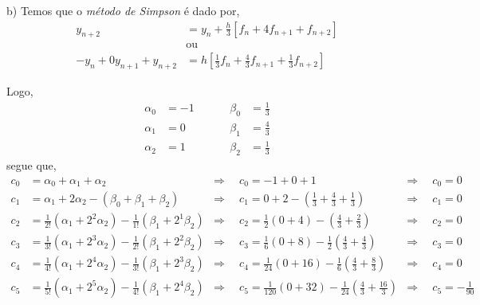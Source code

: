 \documentclass[a4paper,12pt]{article}
\begin{document}
b) Temos que o \textit{m\'etodo de Simpson} \'e dado por,
	\begin{align*}
		y_{n+2} &= y_{n} + \frac{h}{3}[f_{n} + 4f_{n+1} + f_{n+2}]\\
		&\mbox{ou}\\
		-y_{n} + 0y_{n+1} + y_{n+2} &= h[\frac{1}{3}f_{n} + \frac{4} {3}f_{n+1} + \frac{1}{3} f_{n+2}]
	\end{align*}

Logo,
	\begin{align*}
		\alpha_{0} &= -1 \hspace{1cm}& \beta_{0} &= \frac{1}{3}\\
		\alpha_{1} &=  0 \hspace{1cm}& \beta_{1} &= \frac{4}{3}\\
		\alpha_{2} &=  1 \hspace{1cm}& \beta_{2} &= \frac{1}{3}
	\end{align*}
segue que,
	\begin{align*}
		c_{0} &= \alpha_{0} + \alpha_{1} + \alpha_{2} &\Rightarrow \hspace{6pt} &c_{0} = -1 + 0 + 1 &\Rightarrow
		\hspace{2pt} &c_{0} =
		0\\
		c_{1} &= \alpha_{1} + 2\alpha_{2} -(\beta_{0} + \beta_{1} + \beta_{2}) &\Rightarrow \hspace{6pt} &c_{1} = 0 +
		2 - (\frac{1}{3} + \frac{4}{3} + \frac{1}{3}) &\Rightarrow \hspace{2pt} &c_{1} = 0\\
		c_{2} &= \frac{1}{2!}(\alpha_{1} + 2^{2}\alpha_{2}) - \frac{1}{1!}(\beta_{1} + 2^{1}\beta_{2}) &\Rightarrow
		\hspace{6pt} &c_{2} = \frac{1}{2}(0 + 4)-(\frac{4}{3} + \frac{2}{3}) &\Rightarrow \hspace{6pt} &c_{2} = 0 \\
		c_{3} &= \frac{1}{3!}(\alpha_{1} + 2^{3}\alpha_{2}) - \frac{1}{2!}(\beta_{1} + 2^{2}\beta_{2}) &\Rightarrow
		\hspace{6pt} &c_{3} = \frac{1}{6}(0 + 8)-\frac{1}{2}(\frac{4}{3} + \frac{4}{3}) &\Rightarrow \hspace{6pt} &c_{3} = 0\\
		c_{4} &= \frac{1}{4!}(\alpha_{1} + 2^{4}\alpha_{2}) - \frac{1}{3!}(\beta_{1} + 2^{3}\beta_{2}) &\Rightarrow
		\hspace{6pt} &c_{4} = \frac{1}{24}(0 + 16)-\frac{1}{6}(\frac{4}{3} + \frac{8}{3}) &\Rightarrow \hspace{6pt}
		&c_{4} = 0\\
		c_{5} &= \frac{1}{5!}(\alpha_{1} + 2^{5}\alpha_{2}) - \frac{1}{4!}(\beta_{1} + 2^{4}\beta_{2}) &\Rightarrow
		\hspace{6pt} &c_{5} = \frac{1}{120}(0 + 32)-\frac{1}{24}(\frac{4}{3} + \frac{16}{3}) &\Rightarrow \hspace{6pt}
		&c_{5} = -\frac{1}{90}
	\end{align*}
\end{document}
